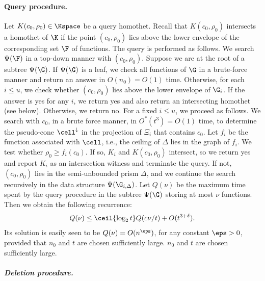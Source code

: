 \paragraph{Query procedure.}
\fi
Let $K(c_0,\rho_0)\in\Kspace$ be a query homothet.
Recall that $K(c_0,\rho_0)$ intersects a homothet of $\K$ if the point $(c_0,\rho_0)$ lies above the 
lower envelope of the corresponding set $\F$ of functions. The query is performed as follows. 
We search $\Psi(\F)$ in a top-down manner with $(c_0,\rho_0)$. Suppose we are at the root of a subtree
$\Psi(\G)$. If $\Psi(\G)$ is a leaf, we check all functions of $\G$ in a brute-force manner and 
return an answer in $O(n_0)=O(1)$ time. Otherwise, for each $i \le u$, we check whether $(c_0,\rho_0)$ 
lies above the lower envelope of $\G_i$. If the answer is yes for any $i$, 
we return yes and also return an intersecting homothet (see below).  Otherwise, we return no.
%
For a fixed $i\le u$, we proceed as follows.
We search with $c_0$, in a brute force manner, in $O^*(t^3) = O(1)$ time, 
to determine the pseudo-cone $\cell^\downarrow$ in  the projection of $\Xi_i$
that contains $c_0$. Let $f_i$ be the  function associated with $\cell$, i.e., 
the ceiling of $\Delta$ lies in the graph of $f_i$.
We test whether $\rho_0 \ge f_i(c_0)$. If so, $K_i$ and $K(c_0,\rho_0)$ intersect, so we
return yes and report $K_i$ as an intersection witness and terminate the query. If not, $(c_0,\rho_0)$
lies in the semi-unbounded prism $\Delta$,
and we continue the search recursively in the data structure $\Psi(\G_{i,\Delta})$.
%
Let $Q(\nu)$ be the maximum time spent by the query procedure in the subtree $\Psi(\G)$ 
storing at most $\nu$ functions. Then we obtain the following recurrence:
\[ Q(\nu) \le \ceil{\log_2 t} Q(c\nu/t) + O(t^{3+\delta}) .\]
Its solution is easily seen to be $Q(\nu) = O(n^\eps)$, for any constant $\eps>0$, provided that 
\ifsocgproc
$n_0$ and $t$ are chosen sufficiently large.
\else 
	$n_0$ and $t$ are chosen sufficiently large.
  \fi
%
\ifsocgproc 
\subparagraph*{Deletion procedure.}
\else
